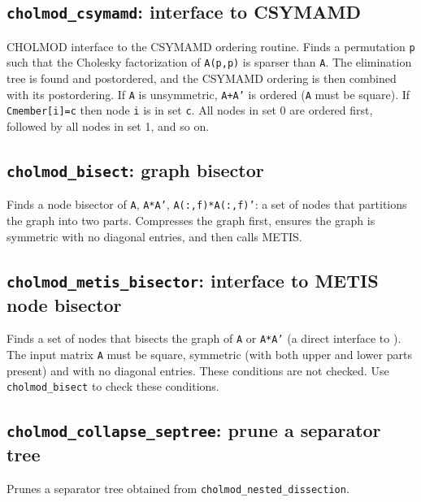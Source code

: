 \documentclass[11pt]{article}
\begin{document}
\subsection{{\tt cholmod\_csymamd}: interface to CSYMAMD}


CHOLMOD interface to the CSYMAMD ordering routine.  Finds a permutation {\tt p}
such that the Cholesky factorization of {\tt A(p,p)} is sparser than {\tt A}.
The elimination tree is found and postordered, and the CSYMAMD ordering is then
combined with its postordering.  If {\tt A} is unsymmetric, {\tt A+A'} is
ordered ({\tt A} must be square).  If {\tt Cmember[i]=c} then node {\tt i} is
in set {\tt c}.  All nodes in set 0 are ordered first, followed by all nodes in
set 1, and so on.

\subsection{{\tt cholmod\_bisect}: graph bisector}


Finds a node bisector of {\tt A}, {\tt A*A'}, {\tt A(:,f)*A(:,f)'}: a set of
nodes that partitions the graph into two parts.  Compresses the graph first,
ensures the graph is symmetric with no diagonal entries, and then calls METIS.

\subsection{{\tt cholmod\_metis\_bisector}: interface to METIS node bisector}


Finds a set of nodes that bisects the graph of {\tt A} or {\tt A*A'} (a direct
interface to ).  The input matrix
{\tt A} must be square, symmetric (with both upper and lower parts present) and
with no diagonal entries.  These conditions are not checked.  Use
{\tt cholmod\_bisect} to check these conditions.

\subsection{{\tt cholmod\_collapse\_septree}: prune a separator tree}


Prunes a separator tree obtained from {\tt cholmod\_nested\_dissection}.

\newpage


\end{document}
